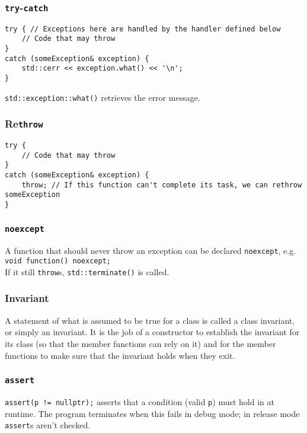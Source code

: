 \documentclass[8pt, table, xcdraw]{article}%
\begin{document}
\subsubsection{\lstinline{try}-\lstinline{catch}}

\begin{lstlisting}
try { // Exceptions here are handled by the handler defined below
    // Code that may throw
}
catch (someException& exception) {
    std::cerr << exception.what() << '\n';
}
\end{lstlisting}

\lstinline{std::exception::what()} retrieves the error message.

\subsubsection{Re\lstinline{throw}}

\begin{lstlisting}
try {
    // Code that may throw
}
catch (someException& exception) {
    throw; // If this function can't complete its task, we can rethrow someException
}
\end{lstlisting}

\subsubsection{\lstinline{noexcept}}
A function that should never throw an exception can be declared \lstinline{noexcept}, e.g. \lstinline{void function() noexcept;}\\
If it still \lstinline{throw}s, \lstinline{std::terminate()} is called.

\subsubsection{Invariant}
A statement of what is assumed to be true for a class is called a class invariant, or simply an invariant. It is the job of a constructor to establish the invariant for its class (so that the member functions can rely on it) and for the member functions to make sure that the invariant holds when they exit.

\subsubsection{\lstinline{assert}}
\lstinline{assert(p != nullptr);} asserts that a condition (valid \lstinline{p}) must hold in at runtime. The program terminates when this fails in debug mode; in release mode \lstinline{assert}s aren't checked.
\end{document}
